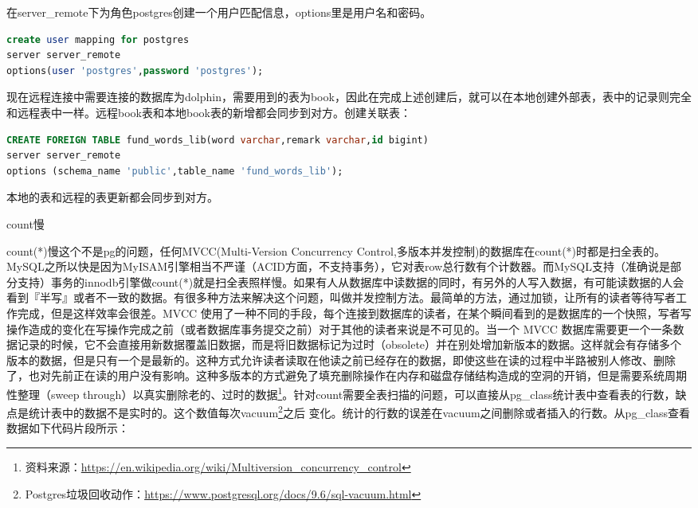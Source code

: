 \documentclass[8pt]{book}
\makeatletter
\numberwithin{dummy}{section}
\theoremstyle{ocrenumbox}
\theoremstyle{blacknumex}
\theoremstyle{blacknumbox}
\theoremstyle{ocrenum}
\renewcommand{\subsection}{\@startsection {subsection}{2}{\z@}
	{-3ex \@plus -0.1ex \@minus -.4ex}
	{0.5ex \@plus.2ex }
	{\normalfont\sffamily\bfseries}}
\makeatother
\begin{document}
在server\_remote下为角色postgres创建一个用户匹配信息，options里是用户名和密码。

\begin{lstlisting}[language=SQL]
create user mapping for postgres 
server server_remote 
options(user 'postgres',password 'postgres');
\end{lstlisting}

现在远程连接中需要连接的数据库为dolphin，需要用到的表为book，因此在完成上述创建后，就可以在本地创建外部表，表中的记录则完全和远程表中一样。远程book表和本地book表的新增都会同步到对方。创建关联表：

\begin{lstlisting}[language=SQL]
CREATE FOREIGN TABLE fund_words_lib(word varchar,remark varchar,id bigint) 
server server_remote
options (schema_name 'public',table_name 'fund_words_lib');
\end{lstlisting}

本地的表和远程的表更新都会同步到对方。

\subsection{count慢}

count(*)慢这个不是pg的问题，任何MVCC(Multi-Version Concurrency Control,多版本并发控制)的数据库在count(*)时都是扫全表的。 MySQL之所以快是因为MyISAM引擎相当不严谨（ACID方面，不支持事务），它对表row总行数有个计数器。而MySQL支持（准确说是部分支持）事务的innodb引擎做count(*)就是扫全表照样慢。如果有人从数据库中读数据的同时，有另外的人写入数据，有可能读数据的人会看到『半写』或者不一致的数据。有很多种方法来解决这个问题，叫做并发控制方法。最简单的方法，通过加锁，让所有的读者等待写者工作完成，但是这样效率会很差。MVCC 使用了一种不同的手段，每个连接到数据库的读者，在某个瞬间看到的是数据库的一个快照，写者写操作造成的变化在写操作完成之前（或者数据库事务提交之前）对于其他的读者来说是不可见的。当一个 MVCC 数据库需要更一个一条数据记录的时候，它不会直接用新数据覆盖旧数据，而是将旧数据标记为过时（obsolete）并在别处增加新版本的数据。这样就会有存储多个版本的数据，但是只有一个是最新的。这种方式允许读者读取在他读之前已经存在的数据，即使这些在读的过程中半路被别人修改、删除了，也对先前正在读的用户没有影响。这种多版本的方式避免了填充删除操作在内存和磁盘存储结构造成的空洞的开销，但是需要系统周期性整理（sweep through）以真实删除老的、过时的数据\footnote{资料来源：\url{https://en.wikipedia.org/wiki/Multiversion_concurrency_control}}。针对count需要全表扫描的问题，可以直接从pg\_class统计表中查看表的行数，缺点是统计表中的数据不是实时的。这个数值每次vacuum\footnote{Postgres垃圾回收动作：\url{https://www.postgresql.org/docs/9.6/sql-vacuum.html}}之后
变化。统计的行数的误差在vacuum之间删除或者插入的行数。从pg\_class查看数据如下代码片段所示：
\end{document}
